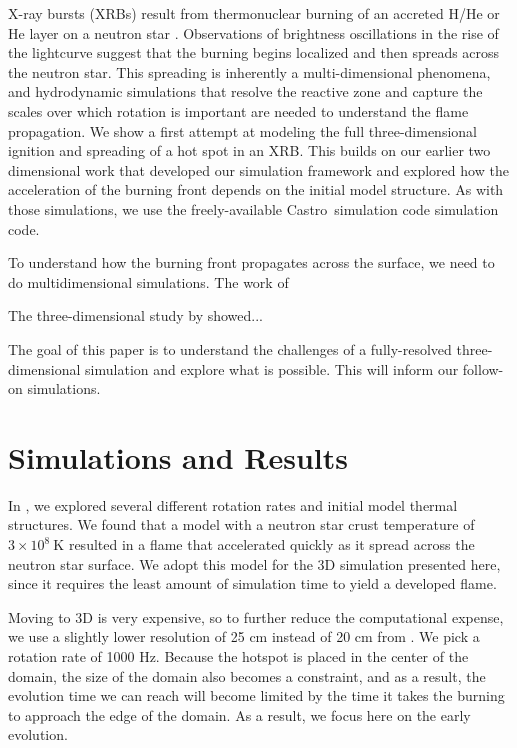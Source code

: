 \documentclass[twocolumn,times,tighten]{aastex631}
\newcommand{\castro}{{\sf Castro}}
\begin{document}
X-ray bursts (XRBs) result from thermonuclear burning of an accreted
H/He or He layer on a neutron star \citep{galloway:2017}.
Observations of brightness oscillations in the rise of the lightcurve
suggest that the burning begins localized and then spreads across the
neutron star.  This spreading is inherently a multi-dimensional
phenomena, and hydrodynamic simulations that resolve the reactive zone
and capture the scales over which rotation is important are needed to
understand the flame propagation.  We show a first attempt at modeling
the full three-dimensional ignition and spreading of a hot spot in an
XRB.  This builds on our earlier two dimensional work
\citep{eiden:2020,harpole:2021} that developed our simulation
framework and explored how the acceleration of the burning front
depends on the initial model structure.  As with those simulations, we
use the freely-available \castro\ simulation code
\citep{castro,castro_joss} simulation code.


To understand how the burning front propagates across the surface, we
need to do multidimensional simulations.  The work of
\citet{cavecchi:2013,art-2015-cavecchi-etal,art-2016-cavecchi-etal}

The three-dimensional study by \citet{Cavecchi2019} showed...

The goal of this paper is to understand the challenges of a fully-resolved
three-dimensional simulation and explore what is possible.  This will inform
our follow-on simulations.

\section{Simulations and Results}\label{Sec:results}

In \citet{harpole:2021}, we explored several different rotation rates
and initial model thermal structures.  We found that a model with a
neutron star crust temperature of $3\times 10^8~\mathrm{K}$ resulted
in a flame that accelerated quickly as it spread across the neutron
star surface.  We adopt this model for the 3D simulation presented
here, since it requires the least amount of simulation time to yield a
developed flame.  


Moving to 3D is very expensive, so to further reduce the computational
expense, we use a slightly lower resolution of 25 cm instead of 20 cm
from \citet{harpole:2021}.  We pick a rotation rate of 1000 Hz.
Because the hotspot is placed in the center of the domain, the size of
the domain also becomes a constraint, and as a result, the evolution
time we can reach will become limited by the time it takes the burning
to approach the edge of the domain.  As a result, we focus here on the
early evolution.
\end{document}
